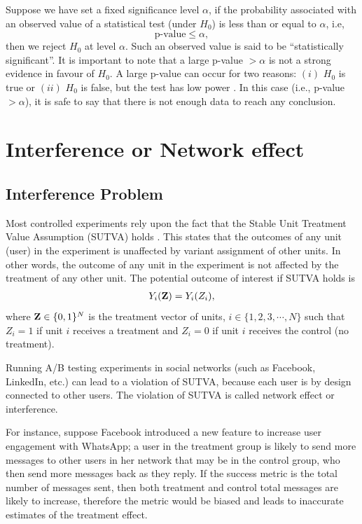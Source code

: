 \documentclass[10pt, aps,twocolumn, superscriptaddress, nofootinbib]{revtex4-2}
\begin{document}
Suppose we have set a fixed significance level $\alpha$, if the probability associated with an observed value of a statistical test (under $H_0$) is less than or equal to $\alpha$, i.e, 
\begin{equation}
	\text{p-value} \leq \alpha,
\end{equation}
then we reject $H_0$ at level $\alpha$.   Such an observed value  is said to be ``statistically significant''. 
It is important to note that a large p-value $>\alpha$ is not a strong evidence in favour of $H_0$. A large p-value can occur for two reasons: $(i)$ $H_0$ is true or $(ii)$  $H_0$ is false, but the test has low power \cite{s3}. In this case (i.e., p-value $>\alpha$), it is safe to say that there is not enough data to reach any conclusion.  

\section{Interference or Network effect}
\subsection{Interference Problem}
Most controlled experiments rely upon the fact that the Stable Unit Treatment Value Assumption (SUTVA) holds \cite{su, su2}. This states that the outcomes of any unit (user) in the experiment is unaffected by variant assignment of other units. In other words, the outcome of any  unit in the experiment is not affected by the treatment of any other  unit. The potential outcome of interest  if SUTVA holds is 
\begin{align}
Y_i({\bf Z}) = Y_i(Z_i),
\end{align}
where ${\bf Z} \in \lbrace 0,1\rbrace^N$ is the treatment vector of units,  $i\in \lbrace 1,2,3,\cdots, N\rbrace$ such that $Z_i =1$ if unit $i$ receives a treatment and $Z_i =0$ if unit $i$ receives the control (no treatment). 

Running A/B testing experiments in social networks (such as Facebook, LinkedIn, etc.) can lead to a violation of SUTVA, because each user is by design connected to other users. The violation of SUTVA is called network effect or interference.

 For instance, suppose Facebook introduced a new feature to increase user engagement with WhatsApp; a user in the treatment group is likely to send more messages to other users in her network that may be in the control group, who then send more messages back as  they reply. If the success metric is the total number of messages sent, then both treatment and control total messages are likely to increase, therefore the metric would be biased and leads to inaccurate estimates of the treatment effect.
\end{document}
